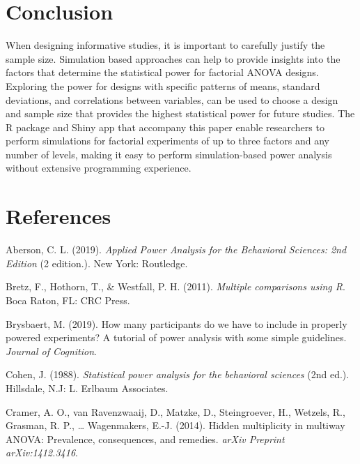 \documentclass[,jou, draftfirst, a4paper,floatsintext]{apa6}
\begin{document}
\hypertarget{conclusion}{%
\section{Conclusion}\label{conclusion}}

When designing informative studies, it is important to carefully justify the sample size.
Simulation based approaches can help to provide insights into the factors that determine the statistical power for factorial ANOVA designs.
Exploring the power for designs with specific patterns of means, standard deviations, and correlations between variables, can be used to choose a design and sample size that provides the highest statistical power for future studies. The R package and Shiny app that accompany this paper enable researchers to perform simulations for factorial experiments of up to three factors and any number of levels, making it easy to perform simulation-based power analysis without extensive programming experience.

\newpage

\hypertarget{references}{%
\section{References}\label{references}}

\setlength{\parindent}{-0.5in}
\setlength{\leftskip}{0.5in}

\hypertarget{refs}{}
\leavevmode\hypertarget{ref-aberson_applied_2019}{}%
Aberson, C. L. (2019). \emph{Applied Power Analysis for the Behavioral Sciences: 2nd Edition} (2 edition.). New York: Routledge.

\leavevmode\hypertarget{ref-bretz_multiple_2011}{}%
Bretz, F., Hothorn, T., \& Westfall, P. H. (2011). \emph{Multiple comparisons using R}. Boca Raton, FL: CRC Press.

\leavevmode\hypertarget{ref-brysbaert_how_2019}{}%
Brysbaert, M. (2019). How many participants do we have to include in properly powered experiments? A tutorial of power analysis with some simple guidelines. \emph{Journal of Cognition}.

\leavevmode\hypertarget{ref-cohen_statistical_1988}{}%
Cohen, J. (1988). \emph{Statistical power analysis for the behavioral sciences} (2nd ed.). Hillsdale, N.J: L. Erlbaum Associates.

\leavevmode\hypertarget{ref-cramer_hidden_2014}{}%
Cramer, A. O., van Ravenzwaaij, D., Matzke, D., Steingroever, H., Wetzels, R., Grasman, R. P., \ldots{} Wagenmakers, E.-J. (2014). Hidden multiplicity in multiway ANOVA: Prevalence, consequences, and remedies. \emph{arXiv Preprint arXiv:1412.3416}.
\end{document}
